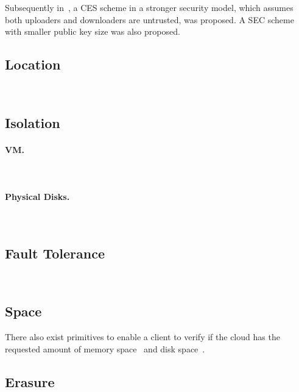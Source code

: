 Subsequently in~\cite{FB06}, a CES scheme in a stronger security model, which assumes both uploaders and downloaders are untrusted, was proposed. A SEC scheme with smaller public key size was also proposed.



\subsection{Location}

~\cite{BDS11,WSA+12}

\subsection{Isolation}

\paragraph{VM.}
~\cite{ZJO+11}

\paragraph{Physical Disks.}

~\cite{WSJ+12,WSJ+13,WSJ+14}

\subsection{Fault Tolerance}

~\cite{BDJ+11}

\subsection{Space}

There also exist primitives to enable a client to verify if the cloud has the requested amount of memory space~\cite{ABF13} and disk space~\cite{DFK+13}.

\subsection{Erasure}

~\cite{PT10}




